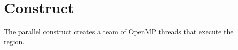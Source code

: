 %
%
%
%
%
%
%
%
%
%
%
%
%



\section{ Construct}
\label{sec:parallel Construct}
\summary
The parallel construct creates a team of OpenMP threads that execute the region.

